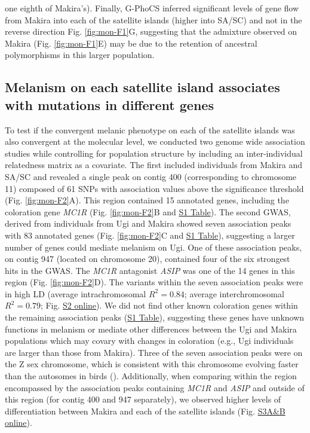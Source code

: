 one eighth of Makira’s). Finally, G-PhoCS inferred significant levels of gene flow from Makira into each of the satellite islands (higher into \ac{SA/SC}) and not in the reverse direction Fig. \ref{fig:mon-F1}G, suggesting that the admixture observed on Makira (Fig. \ref{fig:mon-F1}E) may be due to the retention of ancestral polymorphisms in this larger population.

\subsection{Melanism on each satellite island associates with mutations in different genes}
To test if the convergent melanic phenotype on each of the satellite islands was also convergent at the molecular level, we conducted two  genome wide association studies while controlling for population structure by including an inter-individual relatedness matrix as a covariate. The first included individuals from Makira and \ac{SA/SC} and revealed a single peak on contig 400 (corresponding to chromosome 11) composed of 61 \acsp{SNP} with association values above the significance threshold (Fig. \ref{fig:mon-F2}A). This region contained 15 annotated genes, including the coloration gene \textit{MC1R} (Fig. \ref{fig:mon-F2}B and \href{https://journals.plos.org/PLOSGENETICS/article?id=10.1371/journal.pgen.1010474#sec017}{S1 Table}). The second \acs{GWAS}, derived from individuals from Ugi and Makira showed seven association peaks with 83 annotated genes (Fig. \ref{fig:mon-F2}C and \href{https://journals.plos.org/PLOSGENETICS/article?id=10.1371/journal.pgen.1010474#sec017}{S1 Table}), suggesting a larger number of genes could mediate melanism on Ugi. One of these association peaks, on contig 947 (located on chromosome 20), contained four of the six strongest hits in the \acs{GWAS}. The \textit{MC1R} antagonist \textit{ASIP} was one of the 14 genes in this region (Fig. \ref{fig:mon-F2}D). The variants within the seven association peaks were in high \ac{LD} (average intrachromosomal $R^2 = 0.84$; average interchromosomal $R^2 = 0.79$; Fig. \href{https://journals.plos.org/PLOSGENETICS/article?id=10.1371/journal.pgen.1010474#sec017}{S2 online}). We did not find other known coloration genes within the remaining association peaks (\href{https://journals.plos.org/PLOSGENETICS/article?id=10.1371/journal.pgen.1010474#sec017}{S1 Table}), suggesting these genes have unknown functions in melanism or mediate other differences between the Ugi and Makira populations which may covary with changes in coloration (e.g., Ugi individuals are larger than those from Makira). Three of the seven association peaks were on the Z sex chromosome, which is consistent with this chromosome evolving faster than the autosomes in birds (\cite{irwin2018sex}). Additionally, when comparing within the region encompassed by the association peaks containing \textit{MC1R} and \textit{ASIP} and outside of this region (for contig 400 and 947 separately), we observed higher levels of differentiation between Makira and each of the satellite islands (Fig. \href{https://journals.plos.org/PLOSGENETICS/article?id=10.1371/journal.pgen.1010474#sec017}{S3A\&B online}).

